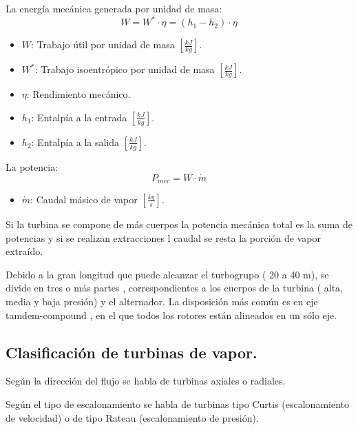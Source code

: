 La energía mecánica generada por unidad de masa:
\[W=W^*\cdot \eta =(h_1-h_2)\cdot \eta\]
\begin{itemize}
	\item $W$: Trabajo útil por unidad de masa $\left[\frac{kJ}{kg}\right]$.
	\item $W^*$: Trabajo isoentrópico por unidad de masa $\left[\frac{kJ}{kg}\right]$.
	\item $\eta$: Rendimiento mecánico.
	\item $h_1$: Entalpía a la entrada $\left[\frac{kJ}{kg}\right]$.
	\item $h_2$: Entalpía a la salida $\left[\frac{kJ}{kg}\right]$.
\end{itemize}


La potencia:
\[P_{mec}=W\cdot \dot{m}\]
\begin{itemize}
	\item $\dot{m}$: Caudal másico de vapor $\left[\frac{kg}{s}\right]$.
\end{itemize}


Si la turbina se compone de más cuerpos la potencia mecánica total es la suma de potencias y si se realizan extracciones l caudal se resta la porción de
vapor extraído.


Debido a la gran longitud que puede alcanzar el turbogrupo ( 20 a 40 m), se divide en tres o
más partes , correspondientes a los cuerpos de la turbina ( alta, media y baja presión) y el alternador. La disposición más común es en eje tamdem-compound , en el que todos los rotores están
alineados en un sólo eje.

\subsection{Clasificación de turbinas de vapor.}
Según la dirección del flujo se habla de turbinas axiales o radiales.


Según el tipo de escalonamiento se habla de turbinas tipo Curtis (escalonamiento de velocidad) o de tipo Rateau (escalonamiento de presión). 


